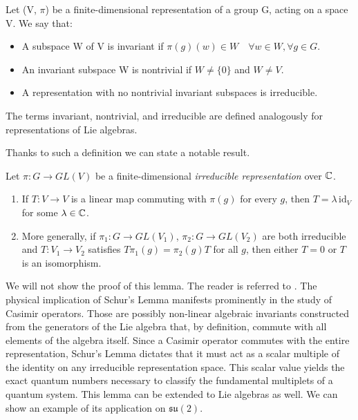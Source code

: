\begin{definition} \label{def:rep-irreps}
	Let (V, $\pi$) be a finite-dimensional representation of a group G, acting on a space V. 
	We say that:
	\begin{itemize}
	 \item A subspace W of V is invariant if $\pi(g)(w) \in W \quad \forall w \in W , \forall g \in G$. 
	 \item An invariant subspace W is nontrivial if $W \neq \{0\}$ and $W \neq V$. 
	 \item A representation with no nontrivial invariant subspaces is irreducible.
	\end{itemize}
	The terms invariant, nontrivial, and irreducible are defined analogously for representations of Lie algebras.
\end{definition}

\noindent Thanks to such a definition we can state a notable result.

\begin{lemma}\label{lem:schur}
	Let $\pi: G \to GL(V)$ be a finite-dimensional \emph{irreducible representation}  over $\mathbb{C}$.
	\begin{enumerate}
		\item If $T: V \to V$ is a linear map commuting with $\pi(g)$ for every $g$, then $T = \lambda \, \mathrm{id}_V$ for some $\lambda \in \mathbb{C}$.
		\item More generally, if $\pi_1: G\to GL(V_1)$, $\pi_2: G\to GL(V_2)$ are both irreducible and $T: V_1 \to V_2$ satisfies $T\pi_1(g) = \pi_2(g)T$ for all $g$, then either $T=0$ or $T$ is an isomorphism.
	\end{enumerate}
\end{lemma}

We will not show the proof of this lemma. The reader is referred to \cite[Theorem 4.26]{hallLieGroupsLie2003}. The physical implication of Schur's Lemma manifests prominently in the study of Casimir operators. Those are possibly non-linear algebraic invariants constructed from the generators of the Lie algebra that, by definition, commute with all elements of the algebra itself. Since a Casimir operator commutes with the entire representation, Schur's Lemma dictates that it must act as a scalar multiple of the identity on any irreducible representation space. This scalar value yields the exact quantum numbers necessary to classify the fundamental multiplets of a quantum system. This lemma can be extended to Lie algebras as well. We can show an example of its application on $\mathfrak{su}(2)$.

